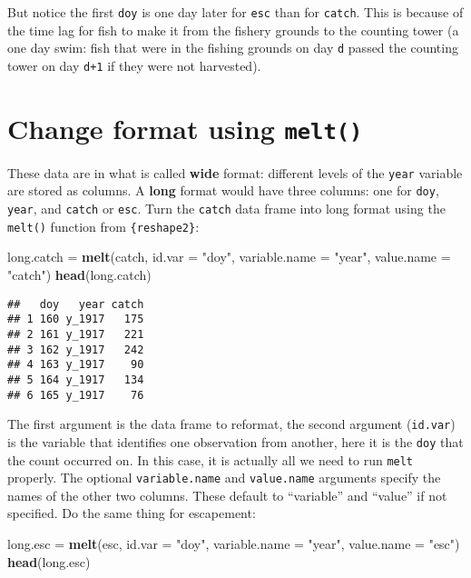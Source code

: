 \documentclass[]{book}
\newenvironment{Shaded}{\begin{snugshade}}{\end{snugshade}}
\newcommand{\KeywordTok}[1]{\textcolor[rgb]{0.13,0.29,0.53}{\textbf{#1}}}
\newcommand{\DataTypeTok}[1]{\textcolor[rgb]{0.13,0.29,0.53}{#1}}
\newcommand{\StringTok}[1]{\textcolor[rgb]{0.31,0.60,0.02}{#1}}
\newcommand{\NormalTok}[1]{#1}
\theoremstyle{definition}
\theoremstyle{definition}
\theoremstyle{definition}
\theoremstyle{remark}
\begin{document}
But notice the first \texttt{doy} is one day later for \texttt{esc} than
for \texttt{catch}. This is because of the time lag for fish to make it
from the fishery grounds to the counting tower (a one day swim: fish
that were in the fishing grounds on day \texttt{d} passed the counting
tower on day \texttt{d+1} if they were not harvested).

\section{\texorpdfstring{Change format using
\texttt{melt()}}{Change format using melt()}}\label{change-format-using-melt}

These data are in what is called \textbf{wide} format: different levels
of the \texttt{year} variable are stored as columns. A \textbf{long}
format would have three columns: one for \texttt{doy}, \texttt{year},
and \texttt{catch} or \texttt{esc}. Turn the \texttt{catch} data frame
into long format using the \texttt{melt()} function from
\texttt{\{reshape2\}}:

\begin{Shaded}
\begin{Highlighting}[]
\NormalTok{long.catch =}\StringTok{ }\KeywordTok{melt}\NormalTok{(catch, }\DataTypeTok{id.var =} \StringTok{"doy"}\NormalTok{,}
                  \DataTypeTok{variable.name =} \StringTok{"year"}\NormalTok{,}
                  \DataTypeTok{value.name =} \StringTok{"catch"}\NormalTok{)}
\KeywordTok{head}\NormalTok{(long.catch)}
\end{Highlighting}
\end{Shaded}

\begin{verbatim}
##   doy   year catch
## 1 160 y_1917   175
## 2 161 y_1917   221
## 3 162 y_1917   242
## 4 163 y_1917    90
## 5 164 y_1917   134
## 6 165 y_1917    76
\end{verbatim}

The first argument is the data frame to reformat, the second argument
(\texttt{id.var}) is the variable that identifies one observation from
another, here it is the \texttt{doy} that the count occurred on. In this
case, it is actually all we need to run \texttt{melt} properly. The
optional \texttt{variable.name} and \texttt{value.name} arguments
specify the names of the other two columns. These default to
``variable'' and ``value'' if not specified. Do the same thing for
escapement:

\begin{Shaded}
\begin{Highlighting}[]
\NormalTok{long.esc =}\StringTok{ }\KeywordTok{melt}\NormalTok{(esc, }\DataTypeTok{id.var =} \StringTok{"doy"}\NormalTok{,}
                \DataTypeTok{variable.name =} \StringTok{"year"}\NormalTok{,}
                \DataTypeTok{value.name =} \StringTok{"esc"}\NormalTok{)}
\KeywordTok{head}\NormalTok{(long.esc)}
\end{Highlighting}
\end{Shaded}
\end{document}
